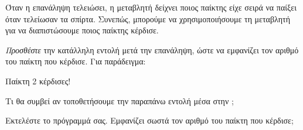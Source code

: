 \documentclass[a4paper,11pt,oneside]{book}
\begin{document}
\begin{step}
Όταν η επανάληψη τελειώσει, η μεταβλητή  δείχνει ποιος παίκτης είχε σειρά να παίξει όταν τελείωσαν τα σπίρτα. Συνεπώς, μπορούμε να χρησιμοποιήσουμε τη μεταβλητή  για να διαπιστώσουμε ποιος παίκτης κέρδισε.

\emph{Προσθέστε} την κατάλληλη εντολή μετά την επανάληψη, ώστε να εμφανίζει τον αριθμό του παίκτη που κέρδισε. Για παράδειγμα:

\marginnote[14pt]{\iconcomputer}
\begin{pyterm}
Παίκτη 2 κέρδισες!
\end{pyterm}

Τι θα συμβεί αν τοποθετήσουμε την παραπάνω εντολή μέσα στην ;

\marginnote[14pt]{\icondiscuss}
\dottedline

Εκτελέστε το πρόγραμμά σας. Εμφανίζει σωστά τον αριθμό του παίκτη που κέρδισε;

\marginnote[14pt]{\icondiscuss}
\dottedline
\end{step}
\end{document}
